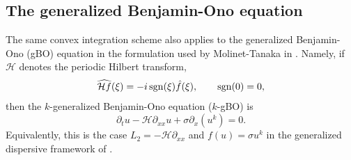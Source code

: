 \documentclass[12pt,reqno,letterpaper]{amsart}
\numberwithin{equation}{section}
\newcommand{\1}{{\bf 1}}
\newcommand{\2}{{\bf 2}}
\newcommand{\T}{\mathbb T}
\theoremstyle{remark}
\theoremstyle{remark}
\begin{document}


\subsection{The generalized Benjamin-Ono equation}\label{sec:gBO-variant}

The same convex integration scheme also applies to the generalized
Benjamin-Ono (\textsf{gBO}) equation in the formulation used by Molinet-Tanaka in \cite{MT}.  Namely, if $\mathcal H$ denotes the periodic Hilbert transform,
\[
\widehat{\mathcal H f}(\xi)=-i\,{\rm sgn}(\xi)\hat{f}(\xi),
\qquad
{\rm sgn}(0)=0,
\]
then the $k$-generalized Benjamin-Ono equation ($k$-\textsf{gBO}) is
\begin{equation}\label{eq:gBO}
    \partial_t u-\mathcal H\partial_{xx}u
    +\sigma\partial_x(u^k)=0.
\end{equation}
Equivalently, this is the case $L_2=-\mathcal H\partial_{xx}$ and
$f(u)=\sigma u^k$ in the generalized dispersive framework of \cite{MT}.
\end{document}

